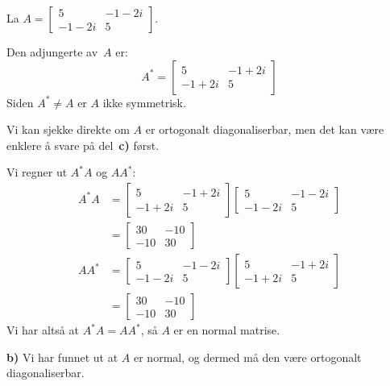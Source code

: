 \begin{losning}
La 
$
A=
\begin{bmatrix}
5 &-1-2i \\-1-2i & 5
\end{bmatrix}.
$
\begin{punkt}
Den adjungerte av~$A$ er:
\[
A^* =
\begin{bmatrix}
5     & -1+2i \\
-1+2i & 5
\end{bmatrix}
\]
Siden $A^* \ne A$ er $A$ ikke symmetrisk.
\end{punkt}
\begin{punkt}
Vi kan sjekke direkte om $A$ er ortogonalt diagonaliserbar, men det
kan være enklere å svare på del~\textbf{c)} først.
\end{punkt}
\begin{punkt}
Vi regner ut $A^* A$ og $A A^*$:
\begin{align*}
A^* A &=
\begin{bmatrix}
5     & -1+2i \\
-1+2i & 5
\end{bmatrix}
\begin{bmatrix}
5 &-1-2i \\
-1-2i & 5
\end{bmatrix}
\\
&=
\begin{bmatrix}
 30 & -10 \\
-10 & 30
\end{bmatrix}
\\
A A^* &=
\begin{bmatrix}
5 &-1-2i \\
-1-2i & 5
\end{bmatrix}
\begin{bmatrix}
5     & -1+2i \\
-1+2i & 5
\end{bmatrix}
\\
&=
\begin{bmatrix}
 30 & -10 \\
-10 & 30
\end{bmatrix}
\end{align*}
Vi har altså at $A^* A = A A^*$, så $A$ er en normal matrise.
\end{punkt}
\smallskip\noindent\textbf{b)} Vi har funnet ut at $A$ er normal, og dermed må den være
ortogonalt diagonaliserbar.
\end{losning}


